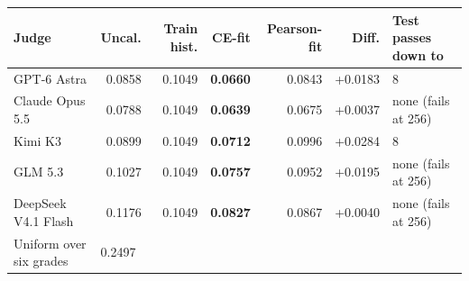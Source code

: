\begin{tabular}{lrrrrrl}
\toprule
Judge & Uncal. & Train hist. & CE-fit & Pearson-fit & Diff. & Test passes down to \\
\midrule
GPT-6 Astra & 0.0858 & 0.1049 & \textbf{0.0660} & 0.0843 & +0.0183 & 8 \\
Claude Opus 5.5 & 0.0788 & 0.1049 & \textbf{0.0639} & 0.0675 & +0.0037 & none (fails at 256) \\
Kimi K3 & 0.0899 & 0.1049 & \textbf{0.0712} & 0.0996 & +0.0284 & 8 \\
GLM 5.3 & 0.1027 & 0.1049 & \textbf{0.0757} & 0.0952 & +0.0195 & none (fails at 256) \\
DeepSeek V4.1 Flash & 0.1176 & 0.1049 & \textbf{0.0827} & 0.0867 & +0.0040 & none (fails at 256) \\
\midrule
Uniform over six grades & \multicolumn{6}{l}{0.2497} \\
\bottomrule
\end{tabular}
